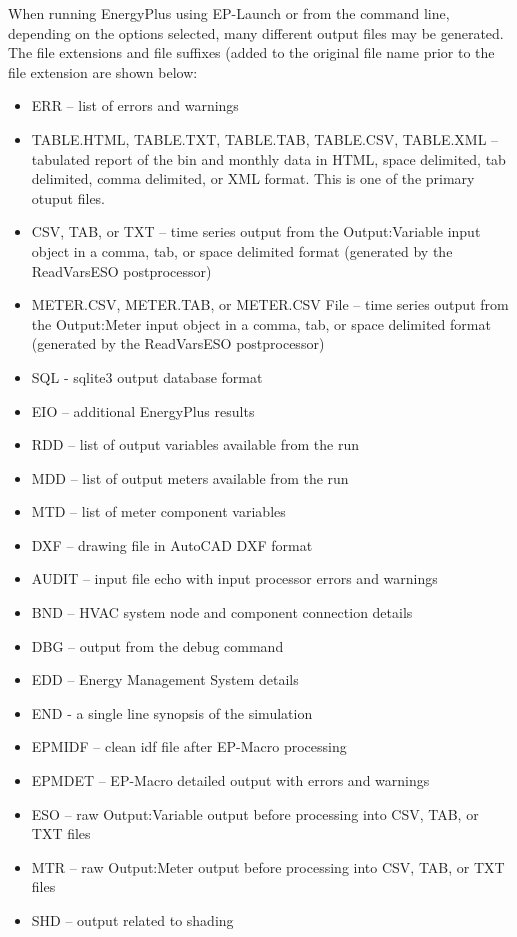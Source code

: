 When running EnergyPlus using EP-Launch or from the command line,
depending on the options selected, many different output files may
be generated. The file extensions and file suffixes (added to the
original file name prior to the file extension are shown below:
\begin{itemize}
\item ERR -- list of errors and warnings
\item TABLE.HTML, TABLE.TXT, TABLE.TAB, TABLE.CSV, TABLE.XML -- tabulated
report of the bin and monthly data in HTML, space delimited, tab delimited,
comma delimited, or XML format. This is one of the primary otuput
files.
\item CSV, TAB, or TXT -- time series output from the Output:Variable input
object in a comma, tab, or space delimited format (generated by the
ReadVarsESO postprocessor)
\item METER.CSV, METER.TAB, or METER.CSV File -- time series output from
the Output:Meter input object in a comma, tab, or space delimited
format (generated by the ReadVarsESO postprocessor)
\item SQL - sqlite3 output database format
\item EIO -- additional EnergyPlus results
\item RDD -- list of output variables available from the run
\item MDD -- list of output meters available from the run
\item MTD -- list of meter component variables
\item DXF -- drawing file in AutoCAD DXF format
\item AUDIT -- input file echo with input processor errors and warnings
\item BND -- HVAC system node and component connection details
\item DBG -- output from the debug command
\item EDD -- Energy Management System details
\item END - a single line synopsis of the simulation
\item EPMIDF -- clean idf file after EP-Macro processing
\item EPMDET -- EP-Macro detailed output with errors and warnings
\item ESO -- raw Output:Variable output before processing into CSV, TAB,
or TXT files
\item MTR -- raw Output:Meter output before processing into CSV, TAB, or
TXT files
\item SHD -- output related to shading

\end{itemize}

